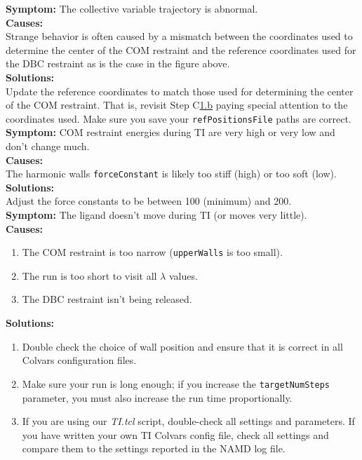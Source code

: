 \documentclass[9pt,tutorial,pubversion]{Styling/livecoms}
\newcommand{\filepath}[1]{\textit{#1}}
\newcommand{\textInput}[1]{\texttt{#1}}
\begin{document}
\noindent\textbf{Symptom:} The collective variable trajectory is abnormal.\\
\textbf{Causes:}\\
Strange behavior is often caused by a mismatch between the coordinates used to determine the center of the COM restraint and the reference coordinates used for the DBC restraint as is the case in the figure above.\\
\textbf{Solutions:}\\
Update the reference coordinates to match those used for determining the center of the COM restraint. That is, revisit Step C\hyperref[step:defineGasRestraints]{1.b} paying special attention to the coordinates used. Make sure you save your \textInput{refPositionsFile} paths are correct. \\

\noindent\textbf{Symptom:} COM restraint energies during TI are very high or very low and don't change much.\\
\textbf{Causes:}\\
The harmonic walls \textInput{forceConstant} is likely too stiff (high) or too soft (low).\\
\textbf{Solutions:}\\
Adjust the force constants to be between 100 (minimum) and 200. \\

\noindent\textbf{Symptom:} The ligand doesn't move during TI (or moves very little).\\
\textbf{Causes:}
\begin{enumerate}
    \item The COM restraint is too narrow (\textInput{upperWalls} is too small).
    \item The run is too short to visit all $\lambda$ values.
    \item The DBC restraint isn't being released.
\end{enumerate}

\noindent\textbf{Solutions:}
\begin{enumerate}
    \item Double check the choice of wall position and ensure that it is correct in all Colvars configuration files.
    \item Make sure your run is long enough; if you increase the \textInput{targetNumSteps} parameter, you must also increase the run time proportionally.
    \item If you are using our \filepath{TI.tcl} script, double-check all settings and parameters. If you have written your own TI Colvars config file, check all settings and compare them to the settings reported in the NAMD log file.
\end{enumerate}
\end{document}

